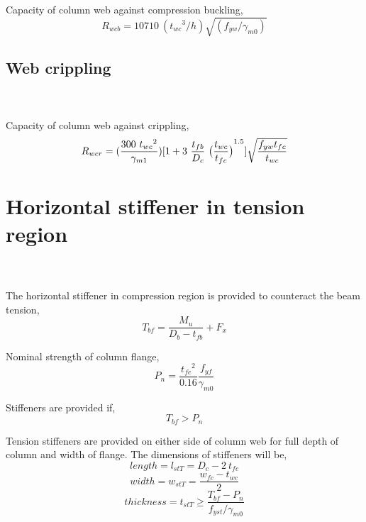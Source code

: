 \documentclass[11.5pt,a4paper,oneside]{report}
\begin{document}
\begin{Form}
Capacity of column web against compression buckling,
\begin{equation}
	R_{wcb} = 10710~({t_{wc}}^3 /h) \sqrt{(f_{yw}/ \gamma_{m0})}
\end{equation}


\subsection{Web crippling}
\qquad {} \\ \\

Capacity of column web against crippling,
\begin{equation}
	R_{wcr} = (\frac{300~ {t_{wc}}^2}{\gamma_{m1}})
	[1+3~\frac{t_{fb}}{D_c} ~ {\big{(}\frac{t_{wc}}{t_{fc}}\big{)}}^{1.5}]
	\sqrt{\frac{f_{yw} t_{fc}}{t_{wc}}}
\end{equation}

\section{Horizontal stiffener in tension region}
\qquad {} \\ \\

The horizontal stiffener in compression region is provided to counteract
the beam tension, 
\begin{equation}
	T_{bf} = \frac{M_u}{D_b - t_{fb}} + F_x
\end{equation}

Nominal strength of column flange, 
\begin{equation}
	P_n = \frac{{t_{fc}}^2}{0.16} \frac{f_{yf}}{\gamma_{m0}}	
\end{equation}

Stiffeners are provided if,
\begin{equation}
	T_{bf} >  P_n
\end{equation}


Tension stiffeners are provided on either side of column web 
for full depth of column and width of flange.
The dimensions of stiffeners will be, \\
\begin{equation}
	length = l_{stT} = D_c-2~t_{fc}
\end{equation}
\begin{equation}
	width = w_{stT} = \frac{w_{fc}-t_{wc}}{2}
\end{equation}
\begin{equation}
	thickness = t_{stT} \ge \frac{T_{bf}-P_n}{f_{yst}/\gamma_{m0}}
\end{equation}



\end{Form}
\end{document}

